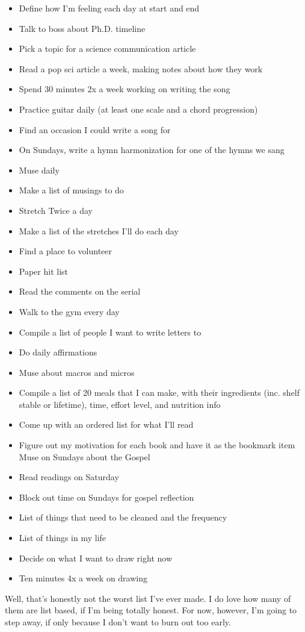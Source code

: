 \documentclass[12pt]{article}[titlepage]
\renewcommand{\,}{\textsuperscript{,}}
\begin{document}
\begin{itemize}  
\item Define how I'm feeling each day at start and end  
\item Talk to boss about Ph.D. timeline  
\item Pick a topic for a science communication article  
\item Read a pop sci article a week, making notes about how they work  
\item Spend 30 minutes 2x a week working on writing the song  
\item Practice guitar daily (at least one scale and a chord progression)  
\item Find an occasion I could write a song for  
\item On Sundays, write a hymn harmonization for one of the hymns we sang  
\item Muse daily  
\item Make a list of musings to do  
\item Stretch Twice a day  
\item Make a list of the stretches I'll do each day  
\item Find a place to volunteer  
\item Paper hit list  
\item Read the comments on the serial  
\item Walk to the gym every day  
\item Compile a list of people I want to write letters to  
\item Do daily affirmations  
\item Muse about macros and micros  
\item Compile a list of 20 meals that I can make, with their ingredients (inc. shelf stable or lifetime), time, effort level, and nutrition info  
\item Come up with an ordered list for what I'll read  
\item Figure out my motivation for each book and have it as the bookmark  
item Muse on Sundays about the Gospel  
\item Read readings on Saturday  
\item Block out time on Sundays for gospel reflection  
\item List of things that need to be cleaned and the frequency  
\item List of things in my life  
\item Decide on what I want to draw right now  
\item Ten minutes 4x a week on drawing  
\end{itemize}

Well, that's honestly not the worst list I've ever made.  
I do love how many of them are list based, if I'm being totally honest.  
For now, however, I'm going to step away, if only because I don't want to burn out too early.  
\end{document}
